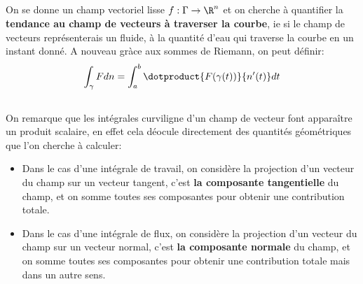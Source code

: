 \subsection*{}
On se donne un champ vectoriel lisse \(f : \Gamma \rightarrow \R^n\) et on cherche à quantifier la \textbf{tendance au champ de vecteurs à traverser la courbe}, ie si le champ de vecteurs représenterais un fluide, à la quantité d'eau qui traverse la courbe en un instant donné. A nouveau gràce aux sommes de Riemann, on peut définir:
\[
   \int_{\gamma} F d n = \int_{a}^{b} \dotproduct{F(\gamma(t))}{n'(t)}d t
\]
\subsection*{}
On remarque que les intégrales curviligne d'un champ de vecteur font apparaître un produit scalaire, en effet cela déocule directement des quantités géométriques que l'on cherche à calculer:
\begin{itemize}
   \item Dans le cas d'une intégrale de travail, on considère la projection d'un vecteur du champ sur un vecteur tangent, c'est \textbf{la composante tangentielle} du champ, et on somme toutes ses composantes pour obtenir une contribution totale.
   \item Dans le cas d'une intégrale de flux, on considère la projection d'un vecteur du champ sur un vecteur normal, c'est \textbf{la composante normale} du champ, et on somme toutes ses composantes pour obtenir une contribution totale mais dans un autre sens.
\end{itemize}
